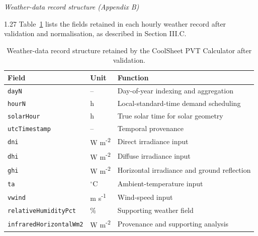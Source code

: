 \documentclass[12pt,letterpaper]{article}
\newcommand{\referenceheading}[1]{\vspace{1.55em}\textit{#1}\par\vspace{0.45em}}
\begin{document}
\referenceheading{Weather-data record structure (Appendix B)}

\begin{spacing}{1.27}
Table~\ref{tab:weather-record} lists the fields retained in each hourly weather record after validation and normalisation, as described in Section III.C.\par
\end{spacing}

\vspace{0.15in}

\begin{table}[htbp]
\centering
\renewcommand{\arraystretch}{1.6}
\setlength{\tabcolsep}{7pt}
\footnotesize
\begin{tabular}{|m{4.8cm}|m{1.7cm}|m{7.1cm}|}
\hline
\textbf{Field} & \textbf{Unit} & \textbf{Function} \\
\hline
\texttt{dayN} & -- & Day-of-year indexing and aggregation \\
\hline
\texttt{hourN} & h & Local-standard-time demand scheduling \\
\hline
\texttt{solarHour} & h & True solar time for solar geometry \\
\hline
\texttt{utcTimestamp} & -- & Temporal provenance \\
\hline
\texttt{dni} & W m\textsuperscript{-2} & Direct irradiance input \\
\hline
\texttt{dhi} & W m\textsuperscript{-2} & Diffuse irradiance input \\
\hline
\texttt{ghi} & W m\textsuperscript{-2} & Horizontal irradiance and ground reflection \\
\hline
\texttt{ta} & $^\circ$C & Ambient-temperature input \\
\hline
\texttt{vwind} & m s\textsuperscript{-1} & Wind-speed input \\
\hline
\texttt{relativeHumidityPct} & \% & Supporting weather field \\
\hline
\texttt{infraredHorizontalWm2} & W m\textsuperscript{-2} & Provenance and supporting analysis \\
\hline
\end{tabular}
\renewcommand{\arraystretch}{1}
\renewcommand{\thetable}{14}
\caption{Weather-data record structure retained by the CoolSheet PVT Calculator after validation.}
\label{tab:weather-record}
\end{table}
\end{document}
